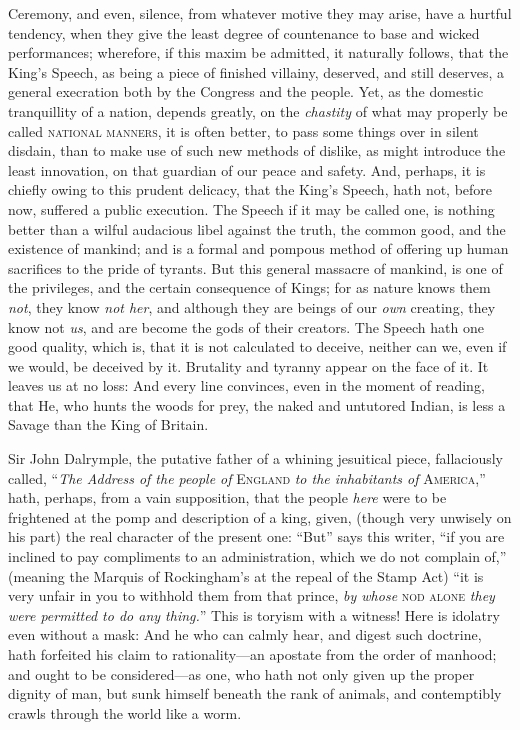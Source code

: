 \documentclass[12pt, twocolumn]{book}
\begin{document}
    Ceremony, and even, silence, from whatever motive they may arise, have a hurtful tendency, when they give the least degree of countenance to base and wicked performances; wherefore, if this maxim be admitted, it naturally follows, that the King’s Speech, as being a piece of finished villainy, deserved, and still deserves, a general execration both by the Congress and the people. Yet, as the domestic tranquillity of a nation, depends greatly, on the \textit{chastity} of what may properly be called \textsc{national manners}, it is often better, to pass some things over in silent disdain, than to make use of such new methods of dislike, as might introduce the least innovation, on that guardian of our peace and safety. And, perhaps, it is chiefly owing to this prudent delicacy, that the King’s Speech, hath not, before now, suffered a public execution. The Speech if it may be called one, is nothing better than a wilful audacious libel against the truth, the common good, and the existence of mankind; and is a formal and pompous method of offering up human sacrifices to the pride of tyrants. But this general massacre of mankind, is one of the privileges, and the certain consequence of Kings; for as nature knows them \textit{not}, they know \textit{not her}, and although they are beings of our \textit{own} creating, they know not \textit{us}, and are become the gods of their creators. The Speech hath one good quality, which is, that it is not calculated to deceive, neither can we, even if we would, be deceived by it. Brutality and tyranny appear on the face of it. It leaves us at no loss: And every line convinces, even in the moment of reading, that He, who hunts the woods for prey, the naked and untutored Indian, is less a Savage than the King of Britain.

    Sir John Dalrymple, the putative father of a whining jesuitical piece, fallaciously called, “\textit{The Address of the people of} \textsc{England} \textit{to the inhabitants of} \textsc{America},” hath, perhaps, from a vain supposition, that the people \textit{here} were to be frightened at the pomp and description of a king, given, (though very unwisely on his part) the real character of the present one: “But” says this writer, “if you are inclined to pay compliments to an administration, which we do not complain of,” (meaning the Marquis of Rockingham’s at the repeal of the Stamp Act) “it is very unfair in you to withhold them from that prince, \textit{by whose} \textsc{nod alone} \textit{they were permitted to do any thing.}” This is toryism with a witness! Here is idolatry even without a mask: And he who can calmly hear, and digest such doctrine, hath forfeited his claim to rationality—an apostate from the order of manhood; and ought to be considered—as one, who hath not only given up the proper dignity of man, but sunk himself beneath the rank of animals, and contemptibly crawls through the world like a worm.
\end{document}
